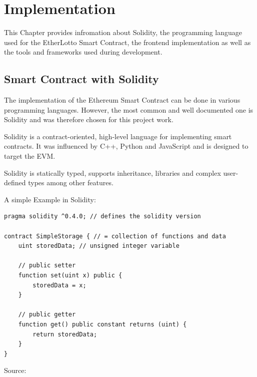 \chapter{Implementation}\label{chap:impl}
\chapterstart

This Chapter provides infromation about Solidity, the programming language used for the EtherLotto Smart Contract, the frontend implementation as well as the tools and frameworks used during development.


\section{ Smart Contract with Solidity}\label{sec:solidity}

The implementation of the Ethereum Smart Contract can be done in various programming languages. However, the most common and well documented one is Solidity and was therefore chosen for this project work.

Solidity is a contract-oriented, high-level language for implementing smart contracts. It was influenced by C++, Python and JavaScript and is designed to target the \ac{EVM}.

Solidity is statically typed, supports inheritance, libraries and complex user-defined types among other features.


A simple Example in Solidity:
\begin{lstlisting}[language=Solidity]
pragma solidity ^0.4.0; // defines the solidity version

contract SimpleStorage { // = collection of functions and data
    uint storedData; // unsigned integer variable

    // public setter
    function set(uint x) public {
        storedData = x;
    }

    // public getter
    function get() public constant returns (uint) {
        return storedData;
    }
}
\end{lstlisting}

\begin{flushright}
Source: 
\end{flushright}

